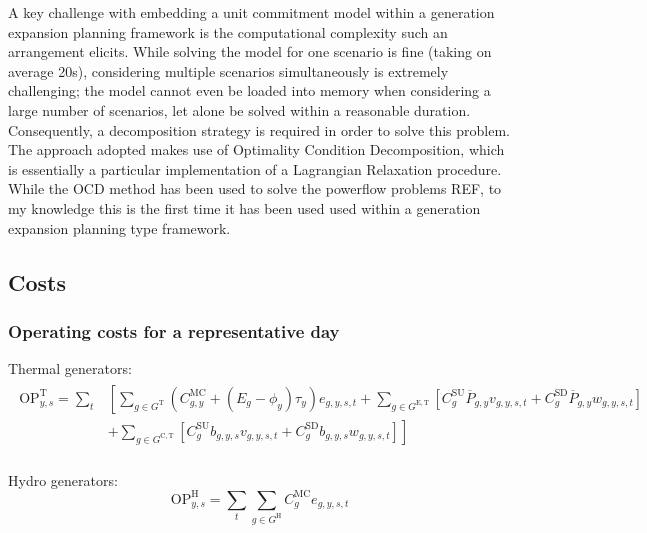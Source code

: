 \documentclass{article}
\newcommand{\sGeneratorsExistingThermal}{G^{\mathrm{E,T}}}
\newcommand{\sGeneratorsCandidateThermal}{G^{\mathrm{C,T}}}
\newcommand{\sGeneratorsThermal}{G^{\mathrm{T}}}
\newcommand{\sGeneratorsHydro}{G^{\mathrm{H}}}
\newcommand{\iGenerator}{g}
\newcommand{\iYear}{y}
\newcommand{\iScenario}{s}
\newcommand{\iInterval}{t}
\newcommand{\cOperatingCostThermal}[1][\iYear,\iScenario]{\mathrm{OP}^{\mathrm{T}}_{#1}}
\newcommand{\cOperatingCostHydro}[1][\iYear,\iScenario]{\mathrm{OP}^{\mathrm{H}}_{#1}}
\newcommand{\cMarginalCost}[1][\iGenerator,\iYear]{C^{\mathrm{MC}}_{#1}}
\newcommand{\cStartupCost}[1][\iGenerator]{C^{\mathrm{SU}}_{#1}}
\newcommand{\cShutdownCost}[1][\iGenerator]{C^{\mathrm{SD}}_{#1}}
\newcommand{\cEmissionsIntensity}[1][\iGenerator]{E_{#1}}
\newcommand{\cPowerOutputMax}[1][\iGenerator,\iYear]{\overline{P}_{#1}}
\newcommand{\vBaseline}[1][\iYear]{\phi_{#1}}
\newcommand{\vPermitPrice}[1][\iYear]{\tau_{#1}}
\newcommand{\vEnergy}[1][\iGenerator,\iYear,\iScenario,\iInterval]{e_{#1}}
\newcommand{\vStartupIndicator}[1][\iGenerator,\iYear,\iScenario,\iInterval]{v_{#1}}
\newcommand{\vShutdownIndicator}[1][\iGenerator,\iYear,\iScenario,\iInterval]{w_{#1}}
\newcommand{\vInstalledCapacityTotalScenario}[1][\iGenerator,\iYear,\iScenario]{b_{#1}}
\begin{document}
A key challenge with embedding a unit commitment model within a generation expansion planning framework is the computational complexity such an arrangement elicits. While solving the model for one scenario is fine (taking on average 20s), considering multiple scenarios simultaneously is extremely challenging; the model cannot even be loaded into memory when considering a large number of scenarios, let alone be solved within a reasonable duration. Consequently, a decomposition strategy is required in order to solve this problem. The approach adopted makes use of Optimality Condition Decomposition, which is essentially a particular implementation of a Lagrangian Relaxation procedure. While the OCD method has been used to solve the powerflow problems REF, to my knowledge this is the first time it has been used used within a generation expansion planning type framework.

\subsection{Costs}
\subsubsection{Operating costs for a representative day}
Thermal generators:
\begin{align}
\begin{split}
\cOperatingCostThermal = \sum\limits_{\iInterval} & \left[\sum\limits_{\iGenerator \in \sGeneratorsThermal} (\cMarginalCost + (\cEmissionsIntensity - \vBaseline)\vPermitPrice)\vEnergy + \sum\limits_{\iGenerator \in \sGeneratorsExistingThermal} \left[\cStartupCost \cPowerOutputMax \vStartupIndicator + \cShutdownCost \cPowerOutputMax \vShutdownIndicator\right] \right.\\
& \left. + \sum\limits_{\iGenerator \in \sGeneratorsCandidateThermal} \left[\cStartupCost \vInstalledCapacityTotalScenario \vStartupIndicator + \cShutdownCost \vInstalledCapacityTotalScenario \vShutdownIndicator\right] \right]\\
\end{split}
\label{eqn: total thermal generator operating cost}
\end{align}

Hydro generators:
\begin{equation}
\cOperatingCostHydro = \sum\limits_{\iInterval}\sum\limits_{\iGenerator \in \sGeneratorsHydro}\cMarginalCost[\iGenerator] \vEnergy
\end{equation}
\end{document}
